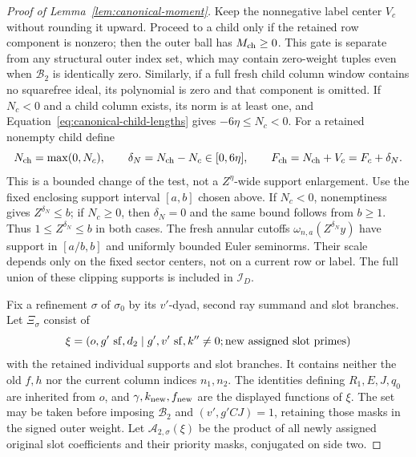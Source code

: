 \documentclass[12pt]{article}
\begin{document}
\begin{proof}[Proof of Lemma~\ref{lem:canonical-moment}]
Keep the nonnegative label center \(V_c\) without rounding it upward.
Proceed to a child only if the retained row component is nonzero; then
the outer ball has \(M_{\rm ch}\ge0\).  This gate is separate from any
structural outer index set, which may contain zero-weight tuples even
when \(\mathcal B_2\) is identically zero.  Similarly, if a full fresh
child column window contains no squarefree ideal, its polynomial is zero
and that component is omitted.  If \(N_c<0\) and a child column exists, its norm is at least one, and
Equation~\eqref{eq:canonical-child-lengths} gives \(-6\eta\le N_c<0\).
For a retained nonempty child define
\begin{equation}\label{eq:inverse-child-clipping}
 N_{\rm ch}=\max(0,N_c),\qquad \delta_N=N_{\rm ch}-N_c\in[0,6\eta],
 \qquad F_{\rm ch}=N_{\rm ch}+V_c=F_c+\delta_N.
\end{equation}
This is a bounded change of the test, not a \(Z^\eta\)-wide support
enlargement. Use the fixed enclosing support interval \([a,b]\)
chosen above. If
\(N_c<0\), nonemptiness gives \(Z^{\delta_N}\le b\); if \(N_c\ge0\),
then \(\delta_N=0\) and the same bound follows from \(b\ge1\).
Thus \(1\le Z^{\delta_N}\le b\) in both cases.  The fresh annular cutoffs
\(\omega_{n,a}(Z^{\delta_N}y)\) have support in \([a/b,b]\) and uniformly
bounded Euler seminorms. Their scale depends only on the fixed sector
centers, not on a current row or label.  The full union of these clipping
supports is included in \(\mathcal I_D\).

Fix a refinement \(\sigma\) of \(\sigma_0\) by its \(v'\)-dyad,
second ray summand and slot branches.
Let \(\Xi_\sigma\) consist of
\[
 \xi=(o,g'\ {\rm sf},d_2\mid g',v'\ {\rm sf},k''\ne0;
               \text{new assigned slot primes})
\]
with the retained individual supports and slot branches.  It contains
neither the old \(f,h\) nor the current column indices \(n_1,n_2\).
The identities defining \(R_1,E,J,q_0\) are inherited from \(o\),
and \(\gamma,k_{\rm new},f_{\rm new}\) are the displayed functions of
\(\xi\).  The set may be taken before imposing \(\mathcal B_2\) and
\((v',g'CJ)=1\), retaining those masks in the signed outer weight.  Let
\(\mathcal A_{2,\sigma}(\xi)\) be the product of all newly assigned
original slot coefficients and their priority masks, conjugated on
side two.


\end{proof}
\end{document}
